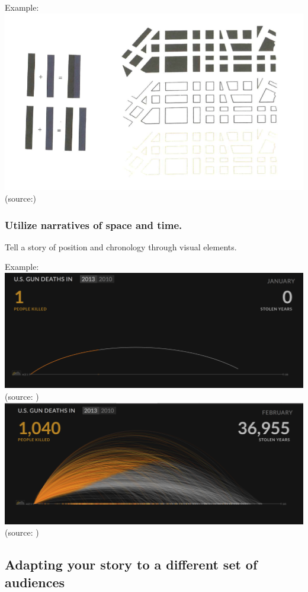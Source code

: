 \documentclass[]{book}
\theoremstyle{definition}
\theoremstyle{definition}
\theoremstyle{definition}
\theoremstyle{remark}
\begin{document}
Example: \includegraphics{images/Tufte_figure10.png}
(source:\citep{Tufte_2001})

\subsubsection{Utilize narratives of space and
time.}\label{utilize-narratives-of-space-and-time.}

Tell a story of position and chronology through visual elements.

Example: \includegraphics{images/Tufte_figure11.png} (source:
\citep{narratives_2017}) \includegraphics{images/Tufte_figure12.png}
(source: \citep{narratives_2017})

\subsection{Adapting your story to a different set of
audiences}\label{adapting-your-story-to-a-different-set-of-audiences}
\end{document}
